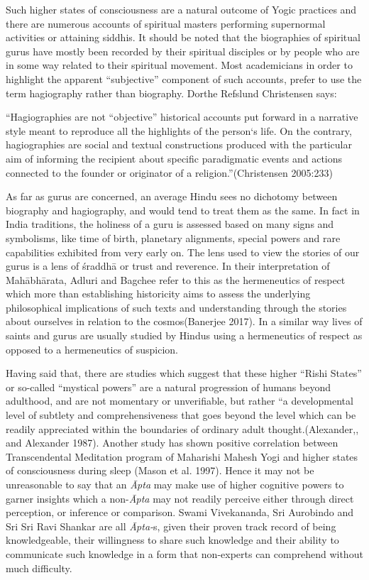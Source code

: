 Such higher states of consciousness are a natural outcome of Yogic practices and there are numerous accounts of spiritual masters performing supernormal activities or attaining siddhis. It should be noted that the biographies of spiritual gurus have mostly been recorded by their spiritual disciples or by people who are in some way related to their spiritual movement. Most academicians in order to highlight the apparent “subjective” component of such accounts, prefer to use the term hagiography rather than biography. Dorthe Refslund Christensen says:

\begin{myquote}
“Hagiographies are not “objective” historical accounts put forward in a narrative style meant to reproduce all the highlights of the person‘s life. On the contrary, hagiographies are social and textual constructions produced with the particular aim of informing the recipient about specific paradigmatic events and actions connected to the founder or originator of a religion.”(Christensen 2005:233)
\end{myquote}

\newpage

As far as gurus are concerned, an average Hindu sees no dichotomy between biography and hagiography, and would tend to treat them as the same. In fact in India traditions, the holiness of a guru is assessed based on many signs and symbolisms, like time of birth, planetary alignments, special powers and rare capabilities exhibited from very early on. The lens used to view the stories of our gurus is a lens of śraddhā or trust and reverence. In their interpretation of Mahābhārata, Adluri and Bagchee refer to this as the hermeneutics of respect which more than establishing historicity aims to assess the underlying philosophical implications of such texts and understanding through the stories about ourselves in relation to the cosmos(Banerjee 2017). In a similar way lives of saints and gurus are usually studied by Hindus using a hermeneutics of respect as opposed to a hermeneutics of suspicion.

Having said that, there are studies which suggest that these higher “Rishi States” or so-called “mystical powers” are a natural progression of humans beyond adulthood, and are not momentary or unverifiable, but rather “a developmental level of subtlety and comprehensiveness that goes beyond the level which can be readily appreciated within the boundaries of ordinary adult thought.(Alexander,, and Alexander 1987). Another study has shown positive correlation between Transcendental Meditation program of Maharishi Mahesh Yogi and higher states of consciousness during sleep (Mason et al. 1997). Hence it may not be unreasonable to say that an \textit{Āpta} may make use of higher cognitive powers to garner insights which a non-\textit{Āpta} may not readily perceive either through direct perception, or inference or comparison. Swami Vivekananda, Sri Aurobindo and Sri Sri Ravi Shankar are all \textit{Āpta-}s, given their proven track record of being knowledgeable, their willingness to share such knowledge and their ability to communicate such knowledge in a form that non-experts can comprehend without much difficulty.



